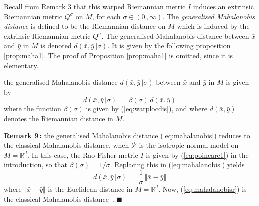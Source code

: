 \documentclass{svmult}
\begin{document}
Recall from Remark 3 that this warped Riemannian metric $I$ induces an extrinsic Riemannian metric $Q^\sigma$ on $M$, for each $\sigma \in (0\,,\infty)$. The \textit{generalised Mahalanobis distance} is defined to be the Riemannian distance on $M$ which is induced by the extrinsic Riemannian metric $Q^\sigma$. The generalised Mahalanobis distance between $\bar{x}$ and $\bar{y}$ in $M$ is denoted $d(\bar{x},\bar{y}\,|\sigma)$. It is given by the following proposition \ref{prop:maha1}. The proof of Proposition \ref{prop:maha1} is omitted, since it is elementary.  
\begin{proposition} \label{prop:maha1}
 the generalised Mahalanobis distance $d(\bar{x},\bar{y}\,|\sigma)$ between $\bar{x}$ and $\bar{y}$ in $M$ is given by
\begin{equation} \label{eq:mahalanobis}
  d(\bar{x},\bar{y}\,|\sigma) \,=\, \beta(\sigma)\,d(\bar{x},\bar{y})
\end{equation}
where the function $\beta(\sigma)$ is given by (\ref{eq:warplocdis}), and where $d(\bar{x},\bar{y})$ denotes the Riemannian distance in $M$. 
\end{proposition}
\textbf{Remark 9\,:} the generalised Mahalanobis distance (\ref{eq:mahalanobis}) reduces to the classical Mahalanobis distance, when $\mathcal{P}$ is the isotropic normal model on $M = \mathbb{R}^d$. In this case, the Rao-Fisher metric $I$ is given by (\ref{eq:poincare1}) in the introduction, so that $\beta(\sigma) = 1/\sigma$. Replacing this in (\ref{eq:mahalanobis}) yields
\begin{equation} \label{eq:mahalanobisr}
  d(\bar{x},\bar{y}\,|\sigma) \,=\, \frac{1}{\sigma}\,\Vert\bar{x} - \bar{y}\Vert 
\end{equation}
where $\Vert\bar{x} - \bar{y}\Vert$ is the Euclidean distance in $M = \mathbb{R}^d$. Now, (\ref{eq:mahalanobisr}) is the classical Mahalanobis distance~\cite{maclahlan}. 
\hfill$\blacksquare$ \\[0.1cm]
\end{document}
